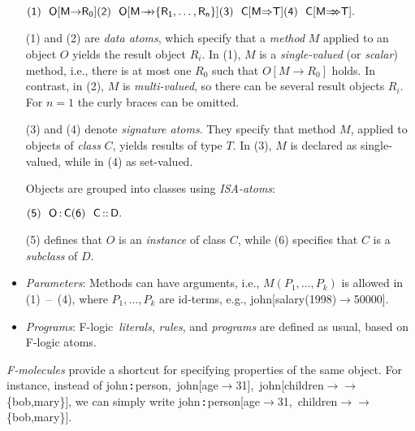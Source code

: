 \documentclass[11pt]{article}
\newcommand{\isa}{\,{\bf{:}}\,}
\newcommand{\subcl}{\,{\bf{::}}\,}
\newcommand{\fd}{\ensuremath{{\rightarrow}}}                   %
\newcommand{\mvd}{\ensuremath{{\rightarrow\!\!\!\!\rightarrow}}}  %
\newcommand{\Fd}{\ensuremath{{\Rightarrow}}}                      %
\newcommand{\Mvd}{\ensuremath{{\Rightarrow\!\!\!\!\Rightarrow}}}  %
\newcommand{\fl}{\mbox{F-logic}\xspace}
\begin{document}
\begin{itemize}
  \begin{math} \sf
    \hfill (1)~~O[M\fd R_0] \hfill (2)~~O[M\mvd \{R_1,\dots,R_n\}]
    \hfill (3)~~C[M\Fd T] \hfill (4)~~C[M\Mvd T]. \hfill
  \end{math} \medskip
  
  (1) and (2) are \emph{data atoms}, which specify that a \emph{method} $M$
  applied to an object $O$ yields the result object $R_i$. In (1), $M$ is a
  \emph{single-valued} (or \emph{scalar}) method, i.e., there is
  at most one $R_0$ such that $O[M\fd R_0]$ holds. In contrast, in
  (2), $M$ is \emph{multi-valued}, so there can be several result objects
  $R_i$. For $n=1$ the curly braces can be omitted.

  \index{signature!in \fl}

  \medskip

  (3) and (4) denote \emph{signature atoms}. They specify that method $M$,
  applied to objects of \emph{class} $C$, yields results of type $T$.
  In (3), $M$ is declared as single-valued, while in (4) as set-valued.
  \medskip

  Objects are grouped into classes using \emph{ISA-atoms}:
  \medskip

  \begin{math}
    \sf \hfill (5)~~O\isa C \hfill (6)~~C\subcl D. \hfill
  \end{math} \medskip

  (5) defines that $O$ is an \emph{instance} of class $C$, while (6)
  specifies that $C$ is a \emph{subclass} of $D$. 
\item \emph{Parameters}: Methods can have arguments, i.e., 
  \begin{math}
    M(P_1,\dots,P_k)
  \end{math}
  is allowed in (1)~--~(4), where $P_1,\dots,P_k$ are
  id-terms, e.g., {\sf john[salary(1998)\fd50000]}.
  
\item \emph{Programs}: \fl\ \emph{literals}, \emph{rules}, and
  \emph{programs} are defined as usual, based on \fl atoms.
\end{itemize}

\noindent
{}
\emph{F-molecules} provide a shortcut for specifying properties of the same
object. For instance, instead of
{\sf john{\isa}person},~{\sf john[age{\fd}31]},~{\sf john[children\mvd\{bob,mary\}]},
we can simply write \linebreak
\mbox{\sf john{\isa}person[age{\fd}31, children\mvd\{bob,mary\}]}.
\end{document}
